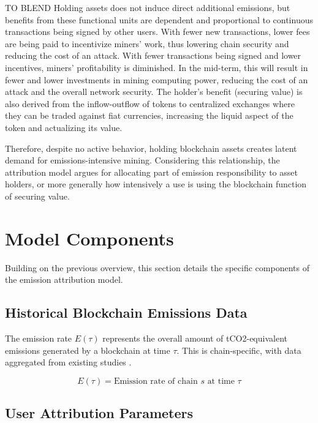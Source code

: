 \documentclass[11pt]{report}
\begin{document}
TO BLEND
Holding assets does not induce direct additional emissions, but benefits from these functional units are dependent and proportional to continuous transactions being signed by other users. With fewer new transactions, lower fees are being paid to incentivize miners' work, thus lowering chain security and reducing the cost of an attack. With fewer transactions being signed and lower incentives, miners' profitability is diminished.  In the mid-term, this will result in fewer and lower investments in mining computing power, reducing the cost of an attack and the overall network security. The holder's benefit (securing value) is also derived from the inflow-outflow of tokens to centralized exchanges where they can be traded against fiat currencies, increasing the liquid aspect of the token and actualizing its value. 

Therefore, despite no active behavior, holding blockchain assets creates latent demand for emissions-intensive mining. Considering this relationship, the attribution model argues for allocating part of emission responsibility to asset holders, or more generally how intensively a use is using the blockchain function of securing value.

\section{Model Components}

Building on the previous overview, this section details the specific components of the emission attribution model.

\subsection{Historical Blockchain Emissions Data}
The emission rate \(E(\tau)\) represents the overall amount of tCO2-equivalent emissions generated by a blockchain at time $\tau$. This is chain-specific, with data aggregated from existing studies \cite{neumuellerCambridgeBitcoinElectricity2021,stollCarbonFootprintBitcoin2019}.

\begin{equation}
    E(\tau) = \text{Emission rate of chain $s$ at time $\tau$}
    \label{eq:emission_rate}
\end{equation}


\subsection{User Attribution Parameters}
\end{document}
